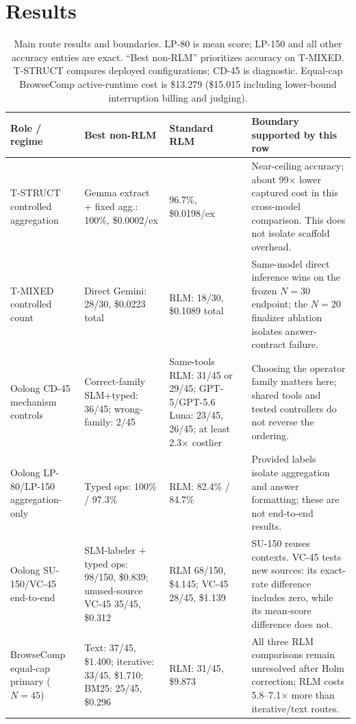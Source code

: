 \documentclass{article}
\begin{document}
\section{Results}

\begin{table}[t]
\caption{Main route results and boundaries. LP-80 is mean score; LP-150 and all other accuracy entries are exact. ``Best non-RLM'' prioritizes accuracy on T-MIXED. T-STRUCT compares deployed configurations; CD-45 is diagnostic. Equal-cap BrowseComp active-runtime cost is \$13.279 (\$15.015 including lower-bound interruption billing and judging).}
\label{tab:compact-main}
\centering
\footnotesize
\setlength{\tabcolsep}{3pt}
\begin{tabular}{@{}L{2.3cm}L{3.0cm}L{2.5cm}L{5.5cm}@{}}
\toprule
\textbf{Role / regime} & \textbf{Best non-RLM} & \textbf{Standard RLM} & \textbf{Boundary supported by this row} \\
\midrule
T-STRUCT controlled aggregation & Gemma extract + fixed agg.: 100\%, \$0.0002/ex & 96.7\%, \$0.0198/ex & Near-ceiling accuracy; about 99$\times$ lower captured cost in this cross-model comparison. This does not isolate scaffold overhead. \\
\addlinespace[3pt]
T-MIXED controlled count & Direct Gemini: 28/30, \$0.0223 total & RLM: 18/30, \$0.1089 total & Same-model direct inference wins on the frozen $N{=}30$ endpoint; the $N{=}20$ finalizer ablation isolates answer-contract failure. \\
\addlinespace[3pt]
Oolong CD-45 mechanism controls & Correct-family SLM+typed: 36/45; wrong-family: 2/45 & Same-tools RLM: 31/45 or 29/45; GPT-5/GPT-5.6 Luna: 23/45, 26/45; at least 2.3$\times$ costlier & Choosing the operator family matters here; shared tools and tested controllers do not reverse the ordering. \\
\addlinespace[3pt]
Oolong \mbox{LP-80/LP-150} aggregation-only & Typed ops: 100\% / 97.3\% & RLM: 82.4\% / 84.7\% & Provided labels isolate aggregation and answer formatting; these are not end-to-end results. \\
\addlinespace[3pt]
Oolong SU-150/VC-45 end-to-end & SLM-labeler + typed ops: 98/150, \$0.839; unused-source VC-45 35/45, \$0.312 & RLM 68/150, \$4.145; VC-45 28/45, \$1.139 & SU-150 reuses contexts. VC-45 tests new sources: its exact-rate difference includes zero, while its mean-score difference does not. \\
\addlinespace[3pt]
BrowseComp equal-cap primary ($N{=}45$) & Text: 37/45, \$1.400; iterative: 33/45, \$1.710; BM25: 25/45, \$0.296 & RLM: 31/45, \$9.873 & All three RLM comparisons remain unresolved after Holm correction; RLM costs 5.8--7.1$\times$ more than iterative/text routes. \\
\bottomrule
\end{tabular}
\end{table}
\end{document}
